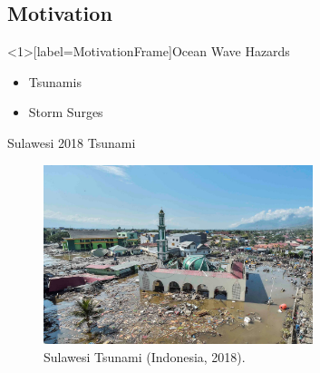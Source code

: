 \documentclass[pdf]{beamer}
\begin{document}
\subsection{Motivation}
\begin{frame}<1>[label=MotivationFrame]{Ocean Wave Hazards}
	\begin{itemize}
		\item Tsunamis
		\pause
		\item Storm Surges
	\end{itemize}
\end{frame}
\begin{frame}{Sulawesi 2018 Tsunami}
	\begin{figure}
		\includegraphics[width=0.7\textwidth]{./Pics/Web/SualwesiTsunami.jpg}
		\caption{Sulawesi Tsunami (Indonesia, 2018).}
	\end{figure}
\end{frame}
\end{document}
